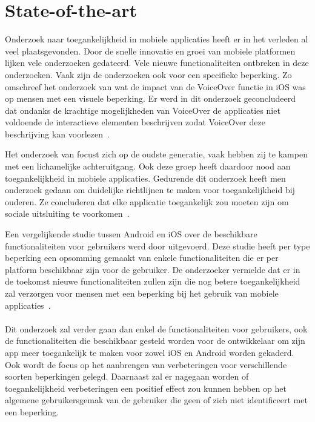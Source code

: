 
\section{State-of-the-art}
\label{sec:state-of-the-art}

Onderzoek naar toegankelijkheid in mobiele applicaties heeft er in het verleden al veel plaatsgevonden. Door de snelle innovatie en groei van mobiele platformen lijken vele onderzoeken gedateerd. Vele nieuwe functionaliteiten ontbreken in deze onderzoeken.
Vaak zijn de onderzoeken ook voor een specifieke beperking. Zo omschreef het onderzoek van \citeauthor{leporini2012interacting} wat de impact van de VoiceOver functie in iOS was op mensen met een visuele beperking. Er werd in dit onderzoek geconcludeerd dat ondanks de krachtige mogelijkheden van VoiceOver de applicaties niet voldoende de interactieve elementen beschrijven zodat VoiceOver deze beschrijving kan voorlezen~\autocite{leporini2012interacting}. 

Het onderzoek van \citeauthor{diaz2014accessibility} focust zich op de oudste generatie, vaak hebben zij te kampen met een lichamelijke achteruitgang. Ook deze groep heeft daardoor nood aan toegankelijkheid in mobiele applicaties. Gedurende dit onderzoek heeft men onderzoek gedaan om duidelijke richtlijnen te maken voor toegankelijkheid bij ouderen. Ze concluderen dat elke applicatie toegankelijk zou moeten zijn om sociale uitsluiting te voorkomen~\autocite{diaz2014accessibility}. 

Een vergelijkende studie tussen Android en iOS over de beschikbare functionaliteiten voor gebruikers werd door \citeauthor{10.1007/978-3-319-07638-6_14} uitgevoerd. Deze studie heeft per type beperking een opsomming gemaakt van enkele functionaliteiten die er per platform beschikbaar zijn voor de gebruiker. De onderzoeker vermelde dat er in de toekomst nieuwe functionaliteiten zullen zijn die nog betere toegankelijkheid zal verzorgen voor mensen met een beperking bij het gebruik van mobiele applicaties~\autocite{10.1007/978-3-319-07638-6_14}. 
\\~\\
Dit onderzoek zal verder gaan dan enkel de functionaliteiten voor gebruikers, ook de functionaliteiten die beschikbaar gesteld worden voor de ontwikkelaar om zijn app meer toegankelijk te maken voor zowel iOS en Android worden gekaderd. Ook wordt de focus op het aanbrengen van verbeteringen voor verschillende soorten beperkingen gelegd. Daarnaast zal er nagegaan worden of toegankelijkheid verbeteringen een positief effect zou kunnen hebben op het algemene gebruikersgemak van de gebruiker die geen of zich niet identificeert met een beperking.


